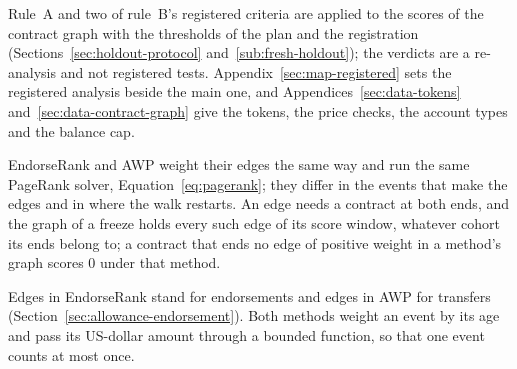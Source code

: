 Rule~A and two of rule~B's registered criteria are applied to the scores of the contract graph with the thresholds of the plan and the registration (Sections~\ref{sec:holdout-protocol} and~\ref{sub:fresh-holdout}); the verdicts are a re-analysis and not registered tests. Appendix~\ref{sec:map-registered} sets the registered analysis beside the main one, and Appendices~\ref{sec:data-tokens} and~\ref{sec:data-contract-graph} give the tokens, the price checks, the account types and the balance cap.


EndorseRank and AWP weight their edges the same way and run the same PageRank solver, Equation~\eqref{eq:pagerank}; they differ in the events that make the edges and in where the walk restarts. An edge needs a contract at both ends, and the graph of a freeze holds every such edge of its score window, whatever cohort its ends belong to; a contract that ends no edge of positive weight in a method's graph scores $0$ under that method.

Edges in EndorseRank stand for endorsements and edges in AWP for transfers (Section~\ref{sec:allowance-endorsement}). Both methods weight an event by its age and pass its US-dollar amount through a bounded function, so that one event counts at most once.


